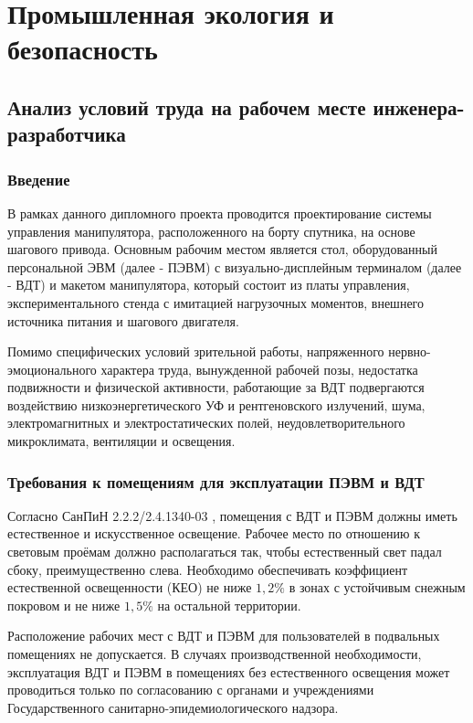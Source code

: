 \newpage
\section{Промышленная экология и безопасность}

\subsection{Анализ условий труда на рабочем месте инженера-разработчика}

\subsubsection{Введение}

В рамках данного дипломного проекта проводится проектирование системы управления
манипулятора, расположенного на борту спутника, на основе шагового привода.
Основным рабочим местом является стол, оборудованный персональной ЭВМ
(далее - ПЭВМ) с визуально-дисплейным терминалом (далее - ВДТ) и макетом
манипулятора, который состоит из платы управления, экспериментального стенда с
имитацией нагрузочных моментов, внешнего источника питания и шагового двигателя.


Помимо специфических условий зрительной работы, напряженного
нервно-эмоционального характера труда, вынужденной рабочей позы, недостатка
подвижности и физической активности, работающие за ВДТ подвергаются воздействию
низкоэнергетического УФ и рентгеновского излучений, шума, электромагнитных и
электростатических полей, неудовлетворительного микроклимата, вентиляции и
освещения.

\subsubsection{Требования к помещениям для эксплуатации ПЭВМ и ВДТ}

Согласно СанПиН 2.2.2/2.4.1340-03 \cite{ecology_sanpin_1340_03}, помещения с ВДТ
и ПЭВМ должны иметь естественное и искусственное освещение. Рабочее место по
отношению к световым проёмам должно располагаться так, чтобы естественный свет
падал сбоку, преимущественно слева. Необходимо обеспечивать коэффициент
естественной освещенности (КЕО) не ниже $1,2 \%$ в зонах с устойчивым снежным
покровом и не ниже $1,5 \%$ на остальной территории.

Расположение рабочих мест с ВДТ и ПЭВМ для пользователей в подвальных помещениях не
допускается. В случаях производственной необходимости, эксплуатация ВДТ и ПЭВМ в
помещениях без естественного освещения может проводиться только по согласованию
с органами и учреждениями Государственного санитарно-эпидемиологического надзора.

